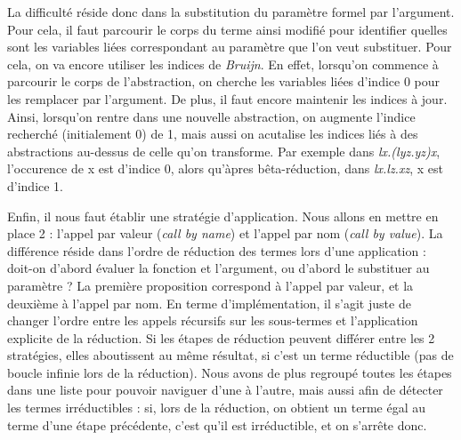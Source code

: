 \documentclass[11pt,a4paper]{report}
\begin{document}
La difficulté réside donc dans la substitution du paramètre formel par l'argument. Pour cela, il faut parcourir le corps du terme ainsi modifié pour identifier quelles sont les variables liées correspondant au paramètre que l'on veut substituer. Pour cela, on va encore utiliser les indices de \textit{Bruijn}. En effet, lorsqu'on commence à parcourir le corps de l'abstraction, on cherche les variables liées d'indice 0 pour les remplacer par l'argument. De plus, il faut encore maintenir les indices à jour. Ainsi, lorsqu'on rentre dans une nouvelle abstraction, on augmente l'indice recherché (initialement 0) de 1, mais aussi on acutalise les indices liés à des abstractions au-dessus de celle qu'on transforme. Par exemple dans \textit{lx.(lyz.yz)x}, l'occurence de x est d'indice 0, alors qu'àpres bêta-réduction, dans \textit{lx.lz.xz}, x est d'indice 1.

\medskip

Enfin, il nous faut établir une stratégie d'application. Nous allons en mettre en place 2 : l'appel par valeur (\textit{call by name}) et l'appel par nom (\textit{call by value}). La différence réside dans l'ordre de réduction des termes lors d'une application : doit-on d'abord évaluer la fonction et l'argument, ou d'abord le substituer au paramètre ? La première proposition correspond à l'appel par valeur, et la deuxième à l'appel par nom. En terme d'implémentation, il s'agit juste de changer l'ordre entre les appels récursifs sur les sous-termes et l'application explicite de la réduction. Si les étapes de réduction peuvent différer entre les 2 stratégies, elles aboutissent au même résultat, si c'est un terme réductible (pas de boucle infinie lors de la réduction). Nous avons de plus regroupé toutes les étapes dans une liste pour pouvoir naviguer d'une à l'autre, mais aussi afin de détecter les termes irréductibles : si, lors de la réduction, on obtient un terme égal au terme d'une étape précédente, c'est qu'il est irréductible, et on s'arrête donc.
\end{document}
